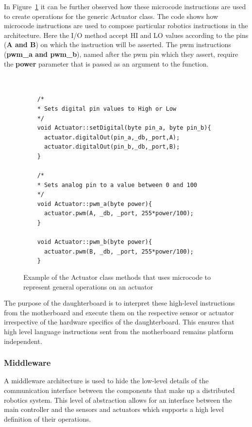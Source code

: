 	In Figure~\ref{code:instr} it can be further observed how these microcode instructions are used to create operations for the generic Actuator class.
The code shows how microcode instructions are used to compose particular robotics instructions in the \xten architecture. Here the I/O method accept HI and LO values according to the pins (\textbf{A and B}) on which the instruction will be asserted. The pwm instructions (\textbf{pwm\_a and pwm\_b}), named after the pwm pin which they assert, require the \textbf{power} parameter that is passed as an argument to the function.
	
    \begin{figure}
    \footnotesize
    {\fontsize{8}{6}\selectfont
    \begin{verbatim}

    
    /*
    * Sets digital pin values to High or Low
    */
    void Actuator::setDigital(byte pin_a, byte pin_b){
      actuator.digitalOut(pin_a,_db,_port,A);
      actuator.digitalOut(pin_b,_db,_port,B);
    }

    /*
    * Sets analog pin to a value between 0 and 100
    */
    void Actuator::pwm_a(byte power){
      actuator.pwm(A, _db, _port, 255*power/100);
    }

    void Actuator::pwm_b(byte power){
      actuator.pwm(B, _db, _port, 255*power/100);
    }

    \end{verbatim}
    }
    \caption{Example of the Actuator class methods that uses microcode to represent general operations on an actuator} \label{code:instr}
    \end{figure}
    
	The purpose of the daughterboard is to interpret these high-level instructions from the motherboard and execute them on the respective sensor or actuator irrespective of the hardware specifics of the daughterboard. This ensures that high level language instructions sent from the motherboard remains platform independent.
	
	
	
	\subsubsection{Middleware} %
	\label{ssub:middleware2}

	A middleware architecture is used to hide the low-level details of the communication interface between the components that make up a distributed robotics system. This level of abstraction allows for an interface between the main controller and the sensors and actuators which supports a high level definition of their operations. 
	
